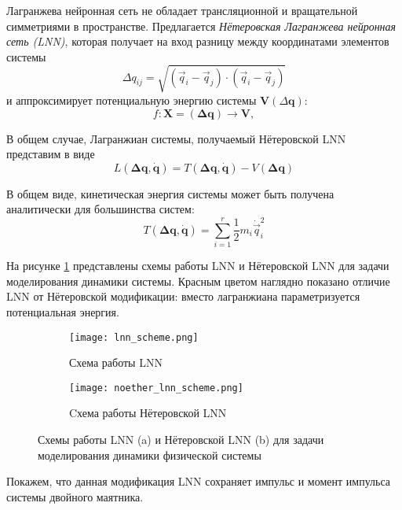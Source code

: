 \documentclass[12pt]{article}
\begin{document}
Лагранжева нейронная сеть не обладает трансляционной и вращательной симметриями в пространстве. Предлагается \textit{Нётеровская Лагранжева нейронная сеть (LNN)}, которая получает на вход разницу между координатами элементов системы
$$\Delta q_{ij} =\sqrt{\left(\vec{q}_{i}-\vec{q}_{j}\right) \cdot\left(\vec{q}_{i}-\vec{q}_{j}\right)}  $$
и аппроксимирует потенциальную энергию системы $\boldsymbol{V}(\Delta \boldsymbol{q})$:
$$f: \boldsymbol{X} = (\boldsymbol{\Delta q})\rightarrow \boldsymbol{V},$$


В общем случае, Лагранжиан системы, получаемый Нётеровской LNN представим в виде
$$ L(\mathbf{\Delta q}, \mathbf{\dot{q}}) = T(\mathbf{\Delta q}, \mathbf{\dot{q}}) - V(\mathbf{\Delta q})$$

В общем виде, кинетическая энергия системы может быть получена аналитически для большинства систем:
$$T(\mathbf{\Delta q}, \mathbf{\dot{q}}) =\sum_{i=1}^{r} \frac{1}{2} m_{i} \dot{\vec{q}}_{i}^{2}$$

На рисунке \ref{fig: lnn_vs_noetherlnn} представлены схемы работы LNN и Нётеровской LNN для задачи моделирования динамики системы. Красным цветом наглядно показано отличие LNN от Нётеровской модификации: вместо лагранжиана параметризуется потенциальная энергия.  

\begin{figure}[H]
	\begin{subfigure}[b]{0.49\textwidth}
		\centering
		\texttt{[image: lnn\_scheme.png]}
		\caption{Схема работы LNN}
	\end{subfigure}
	\hfill
	\begin{subfigure}[b]{0.49\textwidth}
		\centering
		\texttt{[image: noether\_lnn\_scheme.png]}
		\caption{Cхема работы Нётеровской LNN}
	\end{subfigure}
\caption{Схемы работы LNN (a) и Нётеровской LNN (b) для задачи моделирования динамики физической системы}
\label{fig: lnn_vs_noetherlnn}
\end{figure}

Покажем, что данная модификация LNN сохраняет импульс и момент импульса системы двойного маятника.
\end{document}
